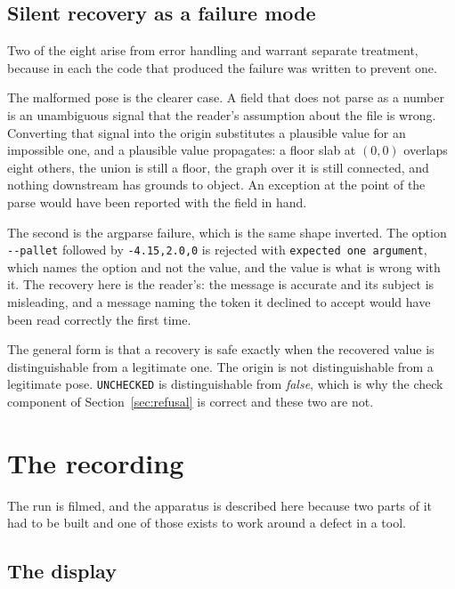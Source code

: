 \documentclass[11pt,a4paper]{article}
\theoremstyle{definition}
\newcommand{\code}[1]{\texttt{\small #1}}
\begin{document}
\subsection{Silent recovery as a failure mode}
\label{sec:silent}

Two of the eight arise from error handling and warrant separate treatment,
because in each the code that produced the failure was written to prevent one.

The malformed pose is the clearer case. A field that does not parse as a number
is an unambiguous signal that the reader's assumption about the file is wrong.
Converting that signal into the origin substitutes a plausible value for an
impossible one, and a plausible value propagates: a floor slab at $(0,0)$
overlaps eight others, the union is still a floor, the graph over it is still
connected, and nothing downstream has grounds to object. An exception at the
point of the parse would have been reported with the field in hand.

The second is the argparse failure, which is the same shape inverted. The
option \code{-{}-pallet} followed by \code{-4.15,2.0,0} is rejected with
\code{expected one argument}, which names the option and not the value, and
the value is what is wrong with it. The recovery here is the reader's: the
message is accurate and its subject is misleading, and a message naming the
token it declined to accept would have been read correctly the first time.

The general form is that a recovery is safe exactly when the recovered value is
distinguishable from a legitimate one. The origin is not distinguishable from a
legitimate pose. \code{UNCHECKED} is distinguishable from \emph{false}, which
is why the check component of Section~\ref{sec:refusal} is correct and these
two are not.

\section{The recording}
\label{sec:recording}

The run is filmed, and the apparatus is described here because two parts of it
had to be built and one of those exists to work around a defect in a tool.

\subsection{The display}
\end{document}
